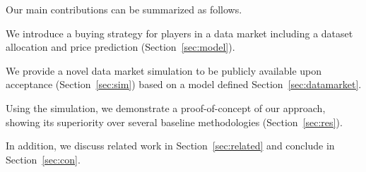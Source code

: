 
Our main contributions can be summarized as follows. 

\begin{compactitem}
	\item We introduce a buying strategy for players in a data market including a dataset allocation and price prediction (Section~\ref{sec:model}).
	\item We provide a novel data market simulation to be publicly available upon acceptance (Section~\ref{sec:sim}) based on a model defined Section~\ref{sec:datamarket}.
	\item Using the simulation, we demonstrate a proof-of-concept of our approach, showing its superiority over several baseline methodologies (Section~\ref{sec:res}).  
\end{compactitem}

In addition, we discuss related work in Section~\ref{sec:related} and conclude in Section~\ref{sec:con}.